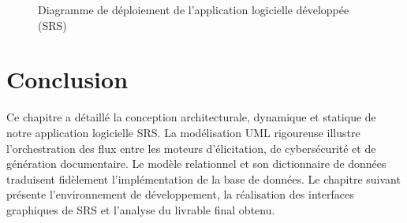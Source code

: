 \begin{figure}[H]
\caption[Diagramme de déploiement de l'application SRS]{Diagramme de déploiement de l'application logicielle développée (SRS)}
\label{fig:deployment_diag}
\end{figure}

\section{Conclusion}

Ce chapitre a détaillé la conception architecturale, dynamique et statique de notre application logicielle SRS. La modélisation UML rigoureuse illustre l'orchestration des flux entre les moteurs d'élicitation, de cybersécurité et de génération documentaire. Le modèle relationnel et son dictionnaire de données traduisent fidèlement l'implémentation de la base de données. Le chapitre suivant présente l'environnement de développement, la réalisation des interfaces graphiques de SRS et l'analyse du livrable final obtenu.

\newpage
